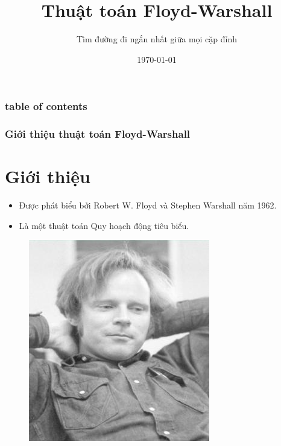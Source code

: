 \documentclass[12pt]{beamer}
\begin{document}
    \title{Thuật toán Floyd-Warshall}
    \subtitle{Tìm đường đi ngắn nhất giữa mọi cặp đỉnh}
    \date{\today}
    \begin{frame}[plain]
        \maketitle
    \end{frame}

    \begin{frame}
    \frametitle{table of contents}
    \tableofcontents
    \end{frame}

    \begin{frame}[t]
        \frametitle{Giới thiệu thuật toán Floyd-Warshall}
        \section{Giới thiệu}

        \begin{itemize}
            \item Được phát biểu bởi Robert W. Floyd và Stephen Warshall năm 1962.
            \item Là một thuật toán Quy hoạch động tiêu biểu.
        \end{itemize}

        \begin{figure}[h]
            \includegraphics[width=.5\textwidth, height=.5\textheight,
            keepaspectratio]{algo/Floyd.jpg}

        \end{figure}
    \end{frame}
\end{document}
